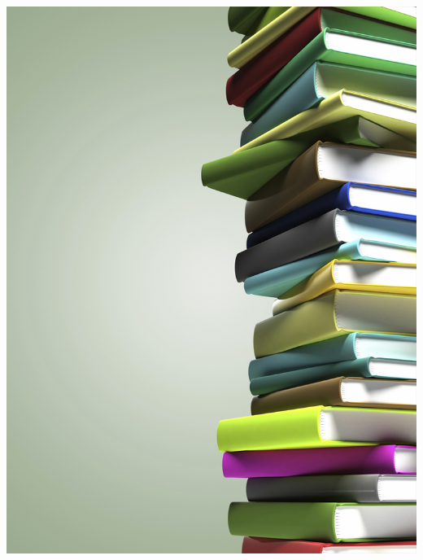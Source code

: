 \begin{frame}
\begin{columns}
\begin{column}{0.3\textwidth}
			\includegraphics[width=\textwidth]{images/bookPile.jpg}
		\end{column}
	\end{columns}

\end{frame}	